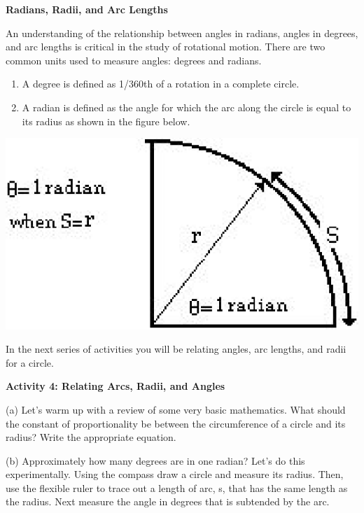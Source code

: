 \textbf{Radians, Radii, and Arc Lengths} 

An understanding of the relationship between angles in radians, angles in degrees, and arc lengths is critical in the study of rotational motion. There are two
common units used to measure angles: degrees and radians.

\begin{enumerate}
\item A degree is defined as 1/360th of a rotation in a complete circle.
\item A radian is defined as the angle for which the arc along the circle is equal to its radius as shown in the figure below.
\end{enumerate}
\vspace{0.3cm}
{\par\centering \includegraphics{rotation/rotation_fig7.eps} \par}
\vspace{0.3cm}

In the next series of activities you will be relating angles, arc lengths, and
radii for a circle.

\pagebreak[2]
\textbf{Activity 4: Relating Arcs, Radii, and Angles} 

(a) Let's warm up with a review of some very basic mathematics. What should
the constant of proportionality be between the circumference of a circle and
its radius? Write the appropriate equation.
\answerspace{10mm}

(b) Approximately how many degrees are in one radian? Let's do this experimentally.
Using the compass draw a circle and measure its radius. Then, use the flexible
ruler to trace out a length of arc, s, that has the same length as the radius.
Next measure the angle in degrees that is subtended by the arc.
\answerspace{40mm}

